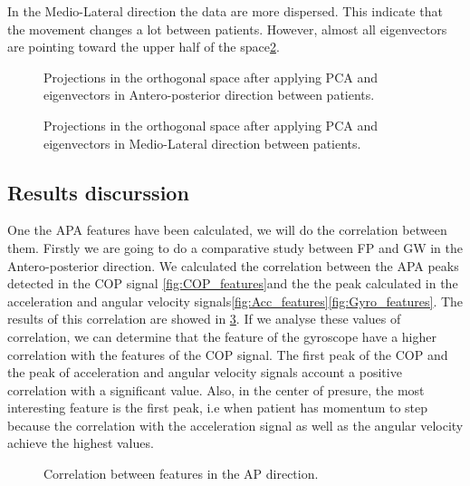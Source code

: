 In the Medio-Lateral direction the data are more dispersed. This indicate that the movement changes a lot between patients. However, almost all eigenvectors are pointing toward the upper half of the space\ref{fig:PCA_ML_patients}.

\begin{figure}[H]
	\centering
	\caption{Projections in the orthogonal space after applying PCA and eigenvectors in Antero-posterior direction between patients.}
	\label{fig:PCA_AP_patients}
\end{figure}

\begin{figure}[H]
	\centering
	\caption{Projections in the orthogonal space after applying PCA and eigenvectors in Medio-Lateral direction between patients.}
	\label{fig:PCA_ML_patients}
\end{figure}


\subsection{Results discurssion}
One the APA features have been calculated, we will do the correlation between them. Firstly we are going to do a comparative study between FP and GW in the Antero-posterior direction. We calculated the correlation between the APA peaks detected in the COP signal \ref{fig:COP_features}and the the peak calculated in the acceleration and angular velocity signals\ref{fig:Acc_features}\ref{fig:Gyro_features}. The results of this correlation are showed in \ref{fig:Corr_AP}. If we analyse these values of correlation, we can determine that the feature of the gyroscope have a higher correlation with the features of the COP signal. The first peak of the COP and the peak of acceleration and angular velocity signals account a positive correlation with a significant value. Also, in the center of presure, the most interesting feature is the first peak, i.e when patient has momentum to step because the correlation with the acceleration signal as well as the angular velocity achieve the highest values.

\begin{figure}[H]
	\centering
	\caption{Correlation between features in the AP direction.}
	\label{fig:Corr_AP}
\end{figure}

